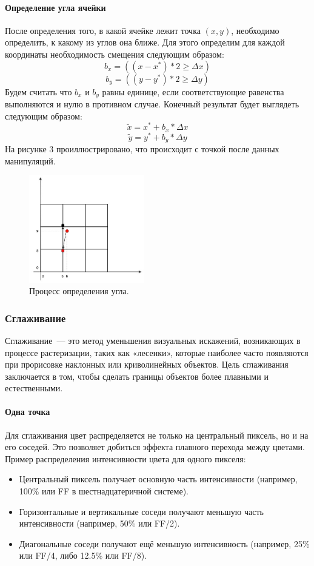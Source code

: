 \paragraph*{Определение угла ячейки}
После определения того, в какой ячейке лежит точка $(x, y)$, необходимо определить, к какому из углов она ближе. Для этого определим для каждой координаты необходимость смещения следующим образом:
\[
    b_x = ((x - x^*) * 2 \geq \Delta x)
\]
\[
    b_y = ((y - y^*) * 2 \geq \Delta y)
\]
Будем считать что $b_x$ и $b_y$ равны единице, если соответствующие равенства выполняются и нулю в противном случае. Конечный результат будет выглядеть следующим образом:
\[
    \tilde{x} = x^* + b_x * \Delta x
\]
\[
    \tilde{y} = y^* + b_y * \Delta y
\]
На рисунке 3 проиллюстрировано, что происходит с точкой после данных манипуляций.
\begin{figure}[H]
    \centering
    \includegraphics[width = 5cm]{third_step.jpg}
    \caption{Процесс определения угла.}
    \label{fig:float}
\end{figure}

\subsubsection*{Сглаживание}
Сглаживание~--- это метод уменьшения визуальных искажений, возникающих в процессе растеризации, таких как «лесенки», которые наиболее часто появляются при прорисовке наклонных или криволинейных объектов. Цель сглаживания заключается в том, чтобы сделать границы объектов более плавными и естественными.

\paragraph*{Одна точка}
Для сглаживания цвет распределяется не только на центральный пиксель, но и на его соседей. Это позволяет добиться эффекта плавного перехода между цветами. Пример распределения интенсивности цвета для одного пикселя:
\begin{itemize}
    \item Центральный пиксель получает основную часть интенсивности (например, 100\% или FF в шестнадцатеричной системе).
    \item Горизонтальные и вертикальные соседи получают меньшую часть интенсивности (например, 50\% или FF/2).
    \item Диагональные соседи получают ещё меньшую интенсивность (например, 25\% или FF/4, либо 12.5\% или FF/8).
\end{itemize}

